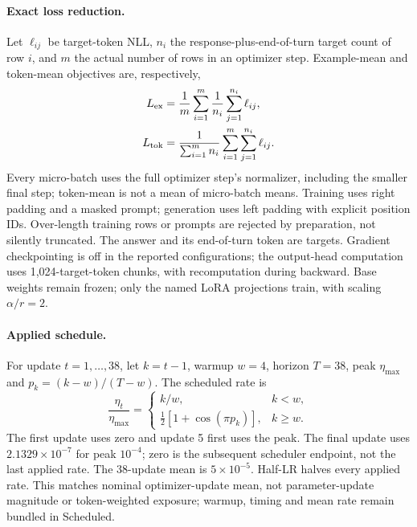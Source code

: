 \documentclass{article}
\begin{document}
\paragraph{Exact loss reduction.} Let $\ell_{ij}$ be target-token NLL,
$n_i$ the response-plus-end-of-turn target count of row $i$, and $m$ the
actual number of rows in an optimizer step. Example-mean and token-mean
objectives are, respectively,
\begin{align}
 L_{\rm ex}&=\frac{1}{m}\sum_{i=1}^{m}
                  \frac{1}{n_i}\sum_{j=1}^{n_i}\ell_{ij},\\
 L_{\rm tok}&=\frac{1}{\sum_{i=1}^{m}n_i}
                  \sum_{i=1}^{m}\sum_{j=1}^{n_i}\ell_{ij}.
\end{align}
Every micro-batch uses the full optimizer step's normalizer, including the
smaller final step; token-mean is not a mean of micro-batch means. Training
uses right padding and a masked prompt; generation uses left padding with
explicit position IDs. Over-length training rows or prompts are rejected
by preparation, not silently truncated. The answer and its end-of-turn token
are targets. Gradient checkpointing is off in the reported configurations;
the output-head computation uses 1,024-target-token chunks, with recomputation
during backward. Base weights remain frozen; only the named LoRA projections
train, with scaling $\alpha/r=2$.

\paragraph{Applied schedule.} For update $t=1,\ldots,38$, let $k=t-1$,
warmup $w=4$, horizon $T=38$, peak $\eta_{\max}$ and
$p_k=(k-w)/(T-w)$. The scheduled rate is
\[
\frac{\eta_t}{\eta_{\max}}=
\begin{cases}
 k/w,&k<w,\\
 \tfrac12[1+\cos(\pi p_k)],&k\geq w.
\end{cases}
\]
The first update uses zero and update 5 first uses the peak. The final
update uses $2.1329\times10^{-7}$ for peak $10^{-4}$; zero is the subsequent
scheduler endpoint, not the last applied rate. The 38-update mean is
$5\times10^{-5}$. Half-LR halves every applied rate. This matches nominal
optimizer-update mean, not parameter-update magnitude or token-weighted
exposure; warmup, timing and mean rate remain bundled in Scheduled.
\end{document}
